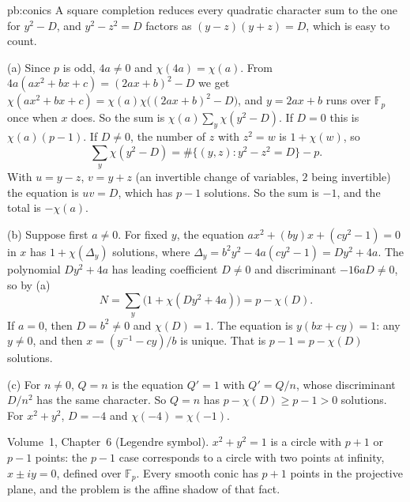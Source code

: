 \begin{solution}{pb:conics}
\idea A square completion reduces every quadratic character sum to the one for $y^2-D$, and $y^2-z^2=D$ factors as
$(y-z)(y+z)=D$, which is easy to count.

\writeup (a) Since $p$ is odd, $4a\ne0$ and $\chi(4a)=\chi(a)$. From $4a(ax^2+bx+c)=(2ax+b)^2-D$ we get
$\chi(ax^2+bx+c)=\chi(a)\chi\bigl((2ax+b)^2-D\bigr)$, and $y=2ax+b$ runs over $\mathbb F_p$ once when $x$ does. So the sum is
$\chi(a)\sum_y\chi(y^2-D)$. If $D=0$ this is $\chi(a)(p-1)$. If $D\ne0$, the number of $z$ with $z^2=w$ is $1+\chi(w)$, so
\[
\sum_y\chi(y^2-D)=\#\{(y,z):y^2-z^2=D\}-p.
\]
With $u=y-z$, $v=y+z$ (an invertible change of variables, $2$ being invertible) the equation is $uv=D$, which has $p-1$
solutions. So the sum is $-1$, and the total is $-\chi(a)$.

(b) Suppose first $a\ne0$. For fixed $y$, the equation $ax^2+(by)x+(cy^2-1)=0$ in $x$ has $1+\chi(\Delta_y)$ solutions, where
$\Delta_y=b^2y^2-4a(cy^2-1)=Dy^2+4a$. The polynomial $Dy^2+4a$ has leading coefficient $D\ne0$ and discriminant $-16aD\ne0$, so
by (a)
\[
N=\sum_y\bigl(1+\chi(Dy^2+4a)\bigr)=p-\chi(D).
\]
If $a=0$, then $D=b^2\ne0$ and $\chi(D)=1$. The equation is $y(bx+cy)=1$: any $y\ne0$, and then $x=(y^{-1}-cy)/b$ is unique. That is
$p-1=p-\chi(D)$ solutions.

(c) For $n\ne0$, $Q=n$ is the equation $Q'=1$ with $Q'=Q/n$, whose discriminant $D/n^2$ has the same character. So $Q=n$ has
$p-\chi(D)\ge p-1>0$ solutions. For $x^2+y^2$, $D=-4$ and $\chi(-4)=\chi(-1)$.

\tools Volume~1, Chapter~6 (Legendre symbol).
\leads $x^2+y^2=1$ is a circle with $p+1$ or $p-1$ points: the $p-1$ case corresponds to a circle with two points at
infinity, $x\pm iy=0$, defined over $\mathbb F_p$. Every smooth conic has $p+1$ points in the projective plane, and the problem
is the affine shadow of that fact.
\end{solution}

